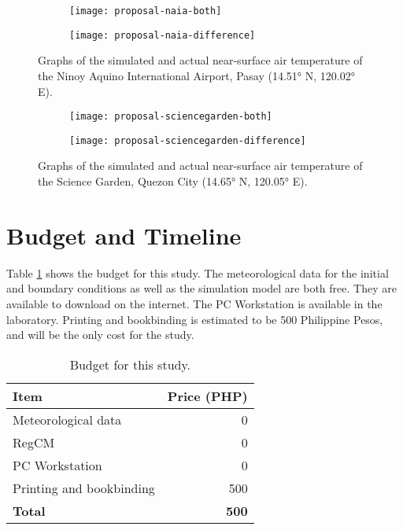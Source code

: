 	\begin{figure}
		\centering
		\begin{subfigure}{\textwidth}
			\texttt{[image: proposal-naia-both]}
		\end{subfigure}
		\begin{subfigure}{\textwidth}
			\texttt{[image: proposal-naia-difference]}
		\end{subfigure}
		\caption{
			Graphs of the simulated and actual near-surface air temperature of the Ninoy Aquino International Airport, Pasay (\ang{14.51} N, \ang{120.02} E).
		}
		\label{fig:proposal-naia-results}
	\end{figure}

	\begin{figure}
		\centering
		\begin{subfigure}{\textwidth}
			\texttt{[image: proposal-sciencegarden-both]}
		\end{subfigure}
		\begin{subfigure}{\textwidth}
			\texttt{[image: proposal-sciencegarden-difference]}
		\end{subfigure}
		\caption{
			Graphs of the simulated and actual near-surface air temperature of the Science Garden, Quezon City (\ang{14.65} N, \ang{120.05} E).
		}
		\label{fig:proposal-sciencegarden-results}
	\end{figure}

\section{Budget and Timeline}

	Table \ref{tab:budget} shows the budget for this study.
	The meteorological data for the initial and boundary conditions as well as the simulation model are both free.
	They are available to download on the internet.
	The PC Workstation is available in the laboratory.
	Printing and bookbinding is estimated to be 500 Philippine Pesos,
		and will be the only cost for the study.

	\begin{table}
		\caption{Budget for this study.}
		\label{tab:budget}
		\centering
		\begin{tabular}{l r}
			\hline \hline
			Item & Price (PHP) \\
			\hline
			Meteorological data	& 0 \\
			RegCM & 0 \\
			PC Workstation & 0 \\
			Printing and bookbinding & 500 \\
			\hline
			\textbf{Total} & \textbf{500} \\
			\hline
		\end{tabular}
	\end{table}

